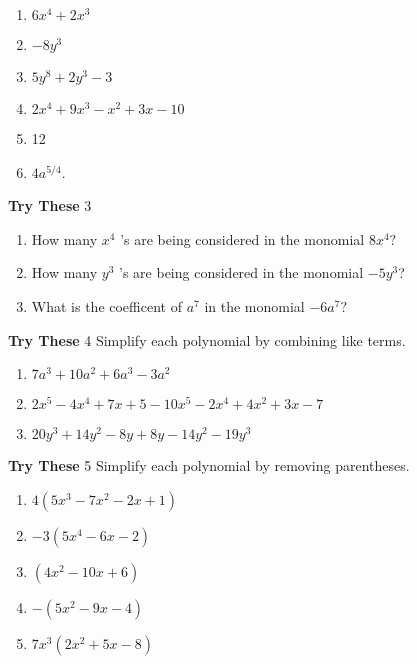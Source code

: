 \documentclass[a4paper]{JAC2003}
\begin{document}
\begin{enumerate}
\item $6 x^{4}+2 x^{3}$

\item $-8 y^{3}$

\item $5 y^{8}+2 y^{3}-3$

\item $2 x^{4}+9 x^{3}-x^{2}+3 x-10$

\item 12

\item $4 a^{5 / 4}$.
\end{enumerate}

\noindent\textcolor{red!75!black}{\textbf{Try These}} 3
\begin{enumerate}
\item How many $x^{4}$ 's are being considered in the monomial $8 x^{4}?$

\item How many $y^{3}$ 's are being considered in the monomial $-5 y^{3}$?

\item What is the coefficent of $a^{7}$ in the monomial $-6 a^{7}?$
\end{enumerate}

\noindent\textcolor{red!75!black}{\textbf{Try These}} 4 Simplify each polynomial by combining like terms.
\begin{enumerate}
\item $7 a^{3}+10 a^{2}+6 a^{3}-3 a^{2}$

\item $2 x^{5}-4 x^{4}+7 x+5-10 x^{5}-2 x^{4}+4 x^{2}+3 x-7$

\item $20 y^{3}+14 y^{2}-8 y+8 y-14 y^{2}-19 y^{3}$
\end{enumerate}

\noindent\textcolor{red!75!black}{\textbf{Try These}} 5 Simplify each polynomial by removing parentheses.
\begin{enumerate}
\item $4\left(5 x^{3}-7 x^{2}-2 x+1\right)$

\item $-3\left(5 x^{4}-6 x-2\right)$

\item $\left(4 x^{2}-10 x+6\right)$

\item $-\left(5 x^{2}-9 x-4\right)$

\item $7 x^{3}\left(2 x^{2}+5 x-8\right)$
\end{enumerate}
\end{document}
